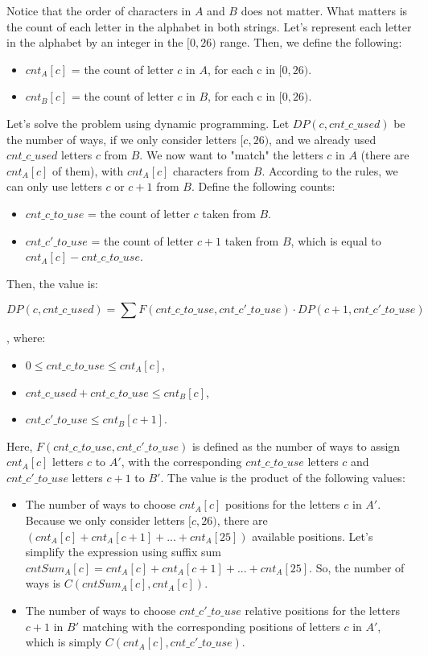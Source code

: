 Notice that the order of characters in $A$ and $B$ does not matter. What matters is the count of each letter in the alphabet in both strings. Let's represent each letter in the alphabet by an integer in the $[0, 26)$ range. Then, we define the following:

\begin{itemize}
  \item $cnt_{A}[c]$ = the count of letter $c$ in $A$, for each c in $[0, 26)$.
  \item $cnt_{B}[c]$ = the count of letter $c$ in $B$, for each c in $[0, 26)$.
\end{itemize}

Let's solve the problem using dynamic programming. Let $DP(c, cnt\_c\_used)$ be the number of ways, if we only consider letters $[c, 26)$, and we already used $cnt\_c\_used$ letters $c$ from $B$. We now want to "match" the letters $c$ in $A$ (there are $cnt_{A}[c]$ of them), with $cnt_{A}[c]$ characters from $B$. According to the rules, we can only use letters $c$ or $c+1$ from $B$. Define the following counts:

\begin{itemize}
  \item $cnt\_c\_to\_use$ = the count of letter $c$ taken from $B$.
  \item $cnt\_c'\_to\_use$ = the count of letter $c+1$ taken from $B$, which is equal to $cnt_{A}[c] - cnt\_c\_to\_use$.
\end{itemize}

Then, the value is:

$$DP(c, cnt\_c\_used) = \sum F(cnt\_c\_to\_use, cnt\_c'\_to\_use) \cdot DP(c+1, cnt\_c'\_to\_use)$$

, where:

\begin{itemize}
  \item $0 \le cnt\_c\_to\_use \le cnt_{A}[c]$,
  \item $cnt\_c\_used + cnt\_c\_to\_use \le cnt_{B}[c]$,
  \item $cnt\_c'\_to\_use \le cnt_{B}[c+1]$.
\end{itemize}

Here, $F(cnt\_c\_to\_use, cnt\_c'\_to\_use)$ is defined as the number of ways to assign $cnt_{A}[c]$ letters $c$ to $A'$, with the corresponding $cnt\_c\_to\_use$ letters $c$ and $cnt\_c'\_to\_use$ letters $c+1$ to $B'$. The value is the product of the following values:

\begin{itemize}
  \item The number of ways to choose $cnt_{A}[c]$ positions for the letters $c$ in $A'$. Because we only consider letters $[c, 26)$, there are $(cnt_{A}[c]+cnt_{A}[c+1]+...+cnt_{A}[25])$  available positions. Let's simplify the expression using suffix sum $cntSum_{A}[c] = cnt_{A}[c]+cnt_{A}[c+1]+...+cnt_{A}[25]$. So, the number of ways is $C(cntSum_{A}[c], cnt_{A}[c])$.
  \item The number of ways to choose $cnt\_c'\_to\_use$ relative positions for the letters $c+1$ in $B'$ matching with the corresponding positions of letters $c$ in $A'$, which is simply $C(cnt_{A}[c],cnt\_c'\_to\_use)$.
\end{itemize}

